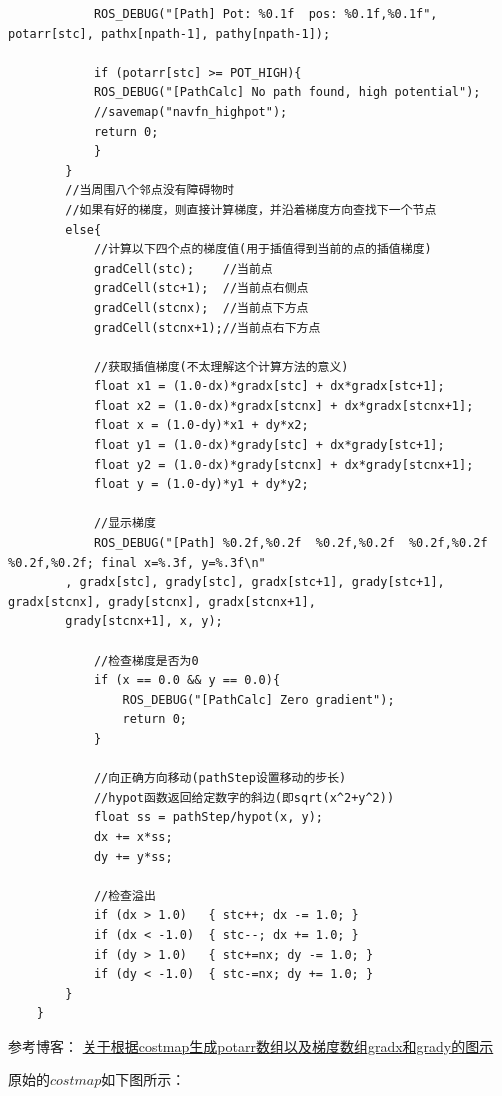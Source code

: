 \documentclass[9pt, oneside]{book}
\begin{document}
\begin{verbatim}
            ROS_DEBUG("[Path] Pot: %0.1f  pos: %0.1f,%0.1f", potarr[stc], pathx[npath-1], pathy[npath-1]);

            if (potarr[stc] >= POT_HIGH){
            ROS_DEBUG("[PathCalc] No path found, high potential");
            //savemap("navfn_highpot");
            return 0;
            }
        }
        //当周围八个邻点没有障碍物时
        //如果有好的梯度，则直接计算梯度，并沿着梯度方向查找下一个节点
        else{
            //计算以下四个点的梯度值(用于插值得到当前的点的插值梯度)
            gradCell(stc);    //当前点
            gradCell(stc+1);  //当前点右侧点
            gradCell(stcnx);  //当前点下方点
            gradCell(stcnx+1);//当前点右下方点

            //获取插值梯度(不太理解这个计算方法的意义)
            float x1 = (1.0-dx)*gradx[stc] + dx*gradx[stc+1];
            float x2 = (1.0-dx)*gradx[stcnx] + dx*gradx[stcnx+1];
            float x = (1.0-dy)*x1 + dy*x2;
            float y1 = (1.0-dx)*grady[stc] + dx*grady[stc+1];
            float y2 = (1.0-dx)*grady[stcnx] + dx*grady[stcnx+1];
            float y = (1.0-dy)*y1 + dy*y2;

            //显示梯度
            ROS_DEBUG("[Path] %0.2f,%0.2f  %0.2f,%0.2f  %0.2f,%0.2f  %0.2f,%0.2f; final x=%.3f, y=%.3f\n"
        , gradx[stc], grady[stc], gradx[stc+1], grady[stc+1], gradx[stcnx], grady[stcnx], gradx[stcnx+1],
        grady[stcnx+1], x, y);

            //检查梯度是否为0
            if (x == 0.0 && y == 0.0){
                ROS_DEBUG("[PathCalc] Zero gradient");	  
                return 0;
            }

            //向正确方向移动(pathStep设置移动的步长)
            //hypot函数返回给定数字的斜边(即sqrt(x^2+y^2))
            float ss = pathStep/hypot(x, y);
            dx += x*ss;
            dy += y*ss;

            //检查溢出
            if (dx > 1.0)   { stc++; dx -= 1.0; }
            if (dx < -1.0)  { stc--; dx += 1.0; }
            if (dy > 1.0)   { stc+=nx; dy -= 1.0; }
            if (dy < -1.0)  { stc-=nx; dy += 1.0; }
        }
    }
\end{verbatim}
\normalsize

参考博客：
\href{https://blog.csdn.net/Neo11111/article/details/104645228}{关于根据costmap生成potarr数组以及梯度数组gradx和grady的图示}

原始的$costmap$如下图所示：
\end{document}
